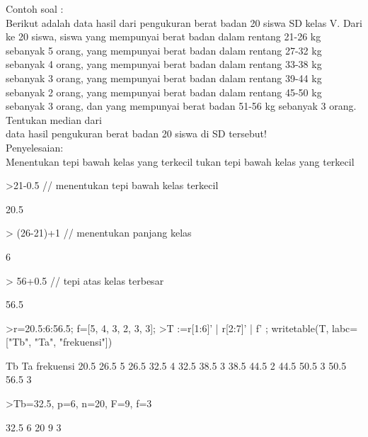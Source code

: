 \documentclass[a4paper,10pt]{article}
\begin{document}
\begin{eulernotebook}
\begin{eulercomment}
\begin{eulercomment}
\begin{eulercomment}
\begin{eulercomment}
\begin{eulercomment}
\begin{eulercomment}
\begin{eulercomment}
\begin{eulercomment}
\begin{eulercomment}
\begin{eulercomment}
\begin{eulercomment}
Contoh soal :\\
Berikut adalah data hasil dari pengukuran berat badan 20 siswa SD
kelas V. Dari ke 20 siswa, siswa yang mempunyai berat badan dalam
rentang 21-26 kg sebanyak 5 orang, yang mempunyai berat badan dalam
rentang 27-32 kg sebanyak 4 orang, yang mempunyai berat badan dalam
rentang 33-38 kg sebanyak 3 orang, yang mempunyai berat badan dalam
rentang 39-44 kg sebanyak 2 orang, yang mempunyai berat badan dalam
rentang 45-50 kg sebanyak 3 orang, dan yang mempunyai berat badan
51-56 kg sebanyak 3 orang. Tentukan median dari\\
data hasil pengukuran berat badan 20 siswa di SD tersebut!\\
Penyelesaian:\\
Menentukan tepi bawah kelas yang terkecil
tukan tepi bawah kelas yang terkecil
\end{eulercomment}
\begin{eulerprompt}
>21-0.5 // menentukan tepi bawah kelas terkecil
\end{eulerprompt}
\begin{euleroutput}
  20.5
\end{euleroutput}
\begin{eulerprompt}
> (26-21)+1 // menentukan panjang kelas
\end{eulerprompt}
\begin{euleroutput}
  6
\end{euleroutput}
\begin{eulerprompt}
> 56+0.5 // tepi atas kelas terbesar
\end{eulerprompt}
\begin{euleroutput}
  56.5
\end{euleroutput}
\begin{eulerprompt}
>r=20.5:6:56.5; f=[5, 4, 3, 2, 3, 3];
>T :=r[1:6]' | r[2:7]' | f' ; writetable(T, labc=["Tb", "Ta", "frekuensi"])
\end{eulerprompt}
\begin{euleroutput}
          Tb        Ta frekuensi
        20.5      26.5         5
        26.5      32.5         4
        32.5      38.5         3
        38.5      44.5         2
        44.5      50.5         3
        50.5      56.5         3
\end{euleroutput}
\begin{eulerprompt}
>Tb=32.5, p=6, n=20, F=9, f=3
\end{eulerprompt}
\begin{euleroutput}
  32.5
  6
  20
  9
  3
\end{euleroutput}

\end{eulercomment}
\end{eulercomment}
\end{eulercomment}
\end{eulercomment}
\end{eulercomment}
\end{eulercomment}
\end{eulercomment}
\end{eulercomment}
\end{eulercomment}
\end{eulercomment}
\end{eulernotebook}
\end{document}
